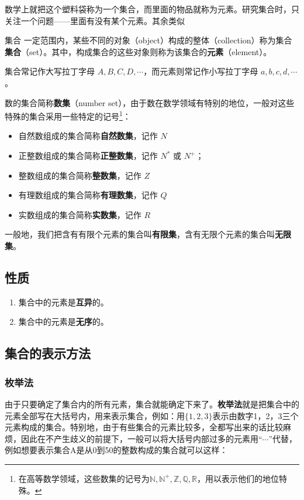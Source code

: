 数学上就把这个塑料袋称为一个集合，而里面的物品就称为元素。研究集合时，只关注一个问题——里面有没有某个元素。其余类似

\begin{definition}{集合}
一定范围内，某些不同的对象（object）构成的整体（collection）称为集合\textbf{集合}（set）。其中，构成集合的这些对象则称为该集合的\textbf{元素}（element）。

集合常记作大写拉丁字母 $A,B,C,D,\cdots$，而元素则常记作小写拉丁字母 $a,b,c,d,\cdots$ 。
\end{definition}

数的集合简称\textbf{数集}（number set），由于数在数学领域有特别的地位，一般对这些特殊的集合采用一些特定的记号\footnote{在高等数学领域，这些数集的记号为$\mathbb{N,N^+,Z,Q,R}$，用以表示他们的地位特殊。}：
\begin{itemize}
\item 自然数组成的集合简称\textbf{自然数集}，记作 $N$
\item 正整数组成的集合简称\textbf{正整数集}，记作 $N^{*}$ 或 $N^{+}$； 
\item 整数组成的集合简称\textbf{整数集}，记作 $Z$
\item 有理数组成的集合简称\textbf{有理数集}，记作 $Q$
\item 实数组成的集合简称\textbf{实数集}，记作 $R$
\end{itemize}

一般地，我们把含有有限个元素的集合叫\textbf{有限集}，含有无限个元素的集合叫\textbf{无限集}。


\subsection{性质}
\begin{enumerate}
\item 集合中的元素是\textbf{互异}的。
\item 集合中的元素是\textbf{无序}的。
\end{enumerate}



\subsection{集合的表示方法}

\subsubsection{枚举法}

由于只要确定了集合内的所有元素，集合就能确定下来了。\textbf{枚举法}就是把集合中的元素全部写在大括号内，用来表示集合，例如：用$\{1,2,3\}$表示由数字1，2，3三个元素构成的集合。特别地，由于有些集合的元素比较多，全都写出来的话比较麻烦，因此在不产生歧义的前提下，一般可以将大括号内部过多的元素用“$\cdots$”代替，例如想要表示集合A是从0到50的整数构成的集合就可以这样：

